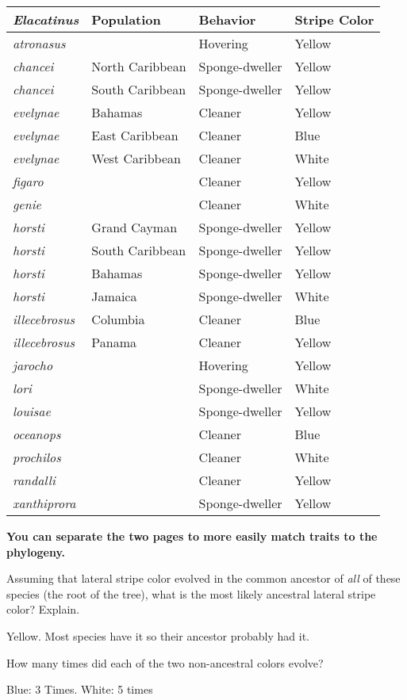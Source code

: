 \documentclass[12pt, hidelinks]{exam}
\newcommand*\AnswerBox[2]{%
    \parbox[t][#1]{0.92\textwidth}{%
    \begin{solution}#2\end{solution}}
    \vspace{\stretch{1}}
}
\begin{document}
\begin{questions}
\label{color_behavior}
\begin{tabular}[c]{@{}llll@{}}
	\toprule
	\textit{Elacatinus}		&	Population		&	Behavior		&	Stripe Color \tabularnewline
	\midrule
	\textit{atronasus}		&					&	Hovering		&	Yellow	\tabularnewline
	\textit{chancei} 		&	North Caribbean	&	Sponge-dweller	&	Yellow	\tabularnewline
	\textit{chancei} 		&	South Caribbean	&	Sponge-dweller	&	Yellow	\tabularnewline
	\textit{evelynae} 		&	Bahamas			&	Cleaner			&	Yellow	\tabularnewline
	\textit{evelynae} 		&	East Caribbean	&	Cleaner			&	Blue 	\tabularnewline
	\textit{evelynae} 		&	West Caribbean	&	Cleaner			&	White	\tabularnewline
	\textit{figaro}			&					&	Cleaner			&	Yellow	\tabularnewline
	\textit{genie}			&					&	Cleaner			&	White	\tabularnewline
	\textit{horsti} 		&	Grand Cayman	&	Sponge-dweller	&	Yellow	\tabularnewline
	\textit{horsti} 		&	South Caribbean	&	Sponge-dweller	&	Yellow	\tabularnewline
	\textit{horsti} 		&	Bahamas			&	Sponge-dweller	&	Yellow	\tabularnewline
	\textit{horsti} 		&	Jamaica			&	Sponge-dweller	&	White	\tabularnewline
	\textit{illecebrosus}	&	Columbia		&	Cleaner			&	Blue	\tabularnewline
	\textit{illecebrosus} 	&	Panama			&	Cleaner			&	Yellow	\tabularnewline
	\textit{jarocho}		&					&	Hovering		&	Yellow	\tabularnewline
	\textit{lori}			&					&	Sponge-dweller	&	White	\tabularnewline
	\textit{louisae}		&					&	Sponge-dweller	&	Yellow	\tabularnewline
	\textit{oceanops}		&					&	Cleaner			&	Blue	\tabularnewline
	\textit{prochilos}		&					&	Cleaner			&	White	\tabularnewline
	\textit{randalli}		&					&	Cleaner			&	Yellow	\tabularnewline
	\textit{xanthiprora}	&					&	Sponge-dweller	&	Yellow	\tabularnewline
	\bottomrule
\end{tabular}

\textbf{You can separate the two pages to more easily match traits to the phylogeny.}

\newpage

\question \label{questions_continued}
Assuming that lateral stripe color evolved in the common ancestor
of \emph{all} of these species (the root of the tree), what is the most likely ancestral lateral
stripe color? Explain. %

\AnswerBox{3\baselineskip}{Yellow. Most species have it so their ancestor probably had it.}

\question
How many times did each of the two non-ancestral colors evolve?

\AnswerBox{2\baselineskip}{Blue: 3 Times. \quad White: 5 times}



\end{questions}
\end{document}
